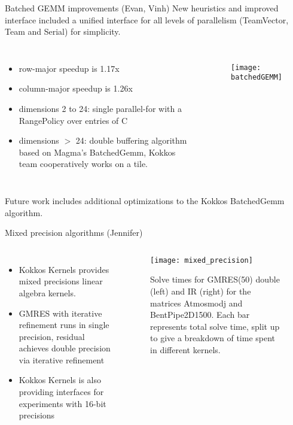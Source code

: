 \begin{frame}[fragile]{Batched GEMM improvements (Evan, Vinh)}
New heuristics and improved interface included a unified interface for all levels of parallelism (TeamVector, Team and Serial) for simplicity.\vspace{-1em}
\begin{columns}[t,onlytextwidth]
  \begin{itemize}
  \item row-major speedup is 1.17x
  \item column-major speedup is 1.26x
  \item dimensions 2 to 24: single parallel-for with a RangePolicy over entries of C
  \item dimensions $>$ 24: double buffering algorithm based on Magma’s BatchedGemm, Kokkos team cooperatively works on a tile.
  \end{itemize}
  \begin{figure}
    \texttt{[image: batchedGEMM]}
  \end{figure}
\end{columns}\vspace{1em}
Future work includes additional optimizations to the Kokkos BatchedGemm algorithm.
\end{frame}

\begin{frame}[fragile]{Mixed precision algorithms (Jennifer)}
\begin{columns}[t,onlytextwidth]
  \begin{itemize}
  \item Kokkos Kernels provides mixed precisions linear algebra kernels.
  \item GMRES with iterative refinement runs in single precision, residual achieves double precision via iterative refinement
  \item Kokkos Kernels is also providing interfaces for experiments with 16-bit precisions
  \end{itemize}
  \begin{center}
    \begin{figure}
      \texttt{[image: mixed\_precision]}
      \caption{\tiny Solve times for GMRES(50) double (left) and IR (right) for the matrices Atmosmodj and BentPipe2D1500. Each bar represents total solve time, split up to give a breakdown of time spent in different kernels.}
    \end{figure}
  \end{center}
\end{columns}
\end{frame}

